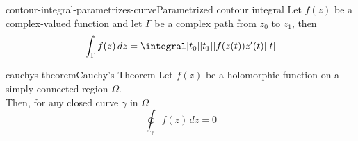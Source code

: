 \documentclass[preview]{standalone}
\begin{document}
\begin{snippettheorem}{contour-integral-parametrizes-curve}{Parametrized contour integral}
    Let \(f(z)\) be a complex-valued function and
    let \(\Gamma\) be a complex path from \(z_0\) to \(z_1\), then
    \[
        \int_\Gamma f(z)\,dz = \integral[t_0][t_1][f(z(t))z'(t)][t]
    \]
\end{snippettheorem}


\begin{snippetdefinition}{cauchys-theorem}{Cauchy's Theorem}
    Let \(f(z)\) be a holomorphic function on a simply-connected region \(\Omega\). \\
    Then, for any closed curve \(\gamma\) in \(\Omega\)
    \[
        \oint_\gamma f(z) \,dz = 0
    \]
\end{snippetdefinition}

\end{document}
